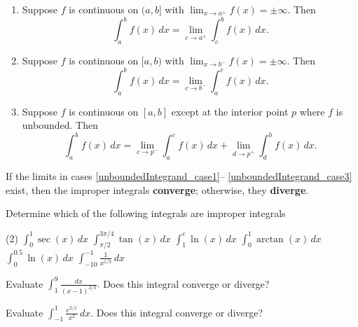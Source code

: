 \documentclass[../mathNotesPreamble]{subfiles}
\begin{document}
    \begin{defn*}
      \begin{enumerate}
        \item \label{unboundedIntegrand_case1} Suppose $f$ is continuous on $(a,b]$ with $\displaystyle \lim_{x\to a^+} f(x)=\pm\infty$. Then
          \[\int_a^b f(x)\,dx=\lim_{c\to a^+} \int_c^b f(x)\,dx.\]
        \item \label{unboundedIntegrand_case2} Suppose $f$ is continuous on $[a,b)$ with $\displaystyle \lim_{x\to b^-} f(x)=\pm\infty$. Then
          \[\int_a^b f(x)\,dx=\lim_{c\to b^-} \int_a^c f(x)\,dx.\]
        \item \label{unboundedIntegrand_case3} Suppose $f$ is continuous on $[a,b]$ except at the interior point $p$ where $f$ is unbounded. Then
          \[\int_a^b f(x)\,dx=\lim_{c\to p^-} \int_a^c f(x)\,dx + \lim_{d\to p^+}\int_d^b f(x)\,dx.\]
      \end{enumerate}
      If the limits in cases \ref{unboundedIntegrand_case1}-- \ref{unboundedIntegrand_case3} exist, then the improper integrals \textbf{converge}; otherwise, they \textbf{diverge}.
    \end{defn*}
    \pagebreak

    \begin{ex*}
      Determine which of the following integrals are improper integrals
    \end{ex*}
    \begin{tasks}[after-item-skip=\stretch{1}, label=, item-indent=0pt](2)
      \task $\displaystyle \int_0^1 \sec(x)\,dx$
      \task $\displaystyle \int_{\pi/2}^{3\pi/4} \tan(x)\,dx$
      \task $\displaystyle \int_1^e \ln(x)\,dx$
      \task $\displaystyle \int_0^1 \arctan(x)\,dx$
      \task $\displaystyle \int_0^{0.5} \ln(x)\,dx$
      \task $\displaystyle \int_{-10}^{-1} \frac{1}{x^{1/3}}\,dx$
    \end{tasks}
    \pagebreak

    \begin{ex*}
      Evaluate $\displaystyle \int_1^9 \frac{dx}{(x-1)^{2/3}}.$ Does this integral converge or diverge?
    \end{ex*}
    \pagebreak

    \begin{ex*}
      Evaluate $\displaystyle \int_{-1}^{1} \frac{e^{2/x}}{x^2}\,dx$. Does this integral converge or diverge?
    \end{ex*}
    \pagebreak
\end{document}
